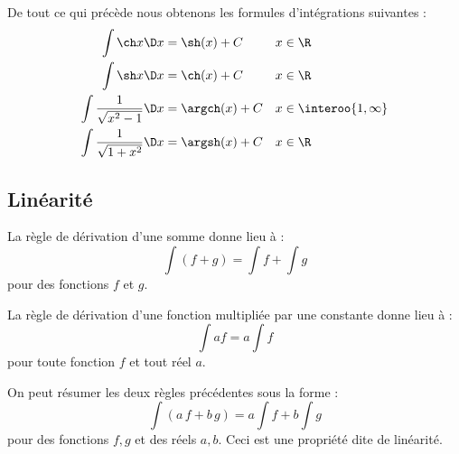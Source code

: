 \begin{frame}
  De tout ce qui précède nous obtenons les formules d'intégrations suivantes :
  \begin{align*}
    \int \ch x \D x                  & = \sh (x) + C    && x \in \R                 \\
    \int \sh x \D x                  & = \ch (x) + C    && x \in \R                 \\
    \int \frac{1}{\sqrt{x^2-1}}\D x  & = \argch (x) + C && x \in \interoo{1,\infty} \\
    \int \frac{1}{\sqrt{1+x^2}} \D x & = \argsh (x) + C && x \in \R
  \end{align*}
\end{frame}

\subsection{Linéarité}
\begin{frame}
  La règle de dérivation d'une somme donne lieu à :\pause{}
  \begin{equation*}
    \int (f+g) = \int f + \int g
  \end{equation*}
  pour des fonctions \(f\) et \(g\).\pause{}

  La règle de dérivation d'une fonction multipliée par une constante donne lieu à :\pause{}
  \begin{equation*}
    \int af = a\int f
  \end{equation*}
  pour toute fonction \(f\) et tout réel \(a\).\pause{}

  On peut résumer les deux règles précédentes sous la forme :
  \begin{equation*}
    \int (a\,f+b\,g) = a \int f + b \int g
  \end{equation*}
  pour des fonctions \(f,g\) et des réels \(a,b\).\pause{} Ceci est une propriété dite de \og linéarité\fg{}.
\end{frame}


